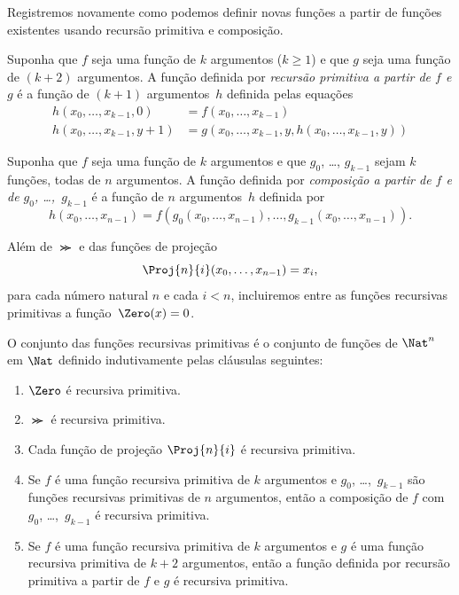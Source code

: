 \documentclass[../../../include/open-logic-section]{subfiles}
\begin{document}

Registremos novamente como podemos definir novas funções a partir de funções
existentes usando recursão primitiva e composição.

\begin{defn}
   Suponha que $f$ seja uma função de
  $k$ argumentos ($k\ge 1$) e que $g$ seja uma função de $(k+2)$ argumentos.
  A função definida por \emph{recursão primitiva a partir de $f$ e $g$} é a
  função de $(k+1)$ argumentos~$h$ definida pelas equações
  \begin{align*}
    h(x_0,\dots,x_{k-1},0) & =  f(x_0,\dots,x_{k-1}) \\
    h(x_0,\dots,x_{k-1},y+1) & = g(x_0,\dots,x_{k-1}, y, h(x_0,\dots,x_{k-1}, y))
  \end{align*}
\end{defn}

\begin{defn}
   Suponha que $f$ seja uma função de $k$ argumentos
  e que $g_0$, \dots, $g_{k-1}$ sejam $k$ funções, todas de $n$ argumentos.
  A função definida por \emph{composição a partir de $f$ e de $g_0$,
    \dots,~$g_{k-1}$} é a função de $n$ argumentos~$h$ definida por
  \[
  h(x_0, \dots, x_{n-1}) =
  f(g_0(x_0, \dots, x_{n-1}), \dots, g_{k-1}(x_0, \dots, x_{n-1})).
  \]
\end{defn}

Além de $\Succ$ e das funções de projeção
\[
\Proj{n}{i}(x_0,\dots,x_{n-1}) = x_i,
\]
para cada número natural $n$ e cada $i < n$, incluiremos entre as funções
recursivas primitivas a função~$\Zero(x) = 0$.

\begin{defn}
  O conjunto das funções recursivas primitivas é o conjunto de funções de
  $\Nat^n$ em $\Nat$ definido indutivamente pelas cláusulas seguintes:
  \begin{enumerate}
  \item $\Zero$ é recursiva primitiva.
  \item $\Succ$ é recursiva primitiva.
  \item Cada função de projeção $\Proj{n}{i}$ é recursiva primitiva.
  \item Se $f$ é uma função recursiva primitiva de $k$ argumentos e $g_0$,
    \dots,~$g_{k-1}$ são funções recursivas primitivas de $n$ argumentos,
    então a composição de $f$ com $g_0$, \dots,~$g_{k-1}$ é recursiva
    primitiva.
  \item Se $f$ é uma função recursiva primitiva de $k$ argumentos e $g$ é
    uma função recursiva primitiva de $k+2$ argumentos, então a função
    definida por recursão primitiva a partir de $f$ e $g$ é recursiva
    primitiva.
\end{enumerate}
\end{defn}
\end{document}
